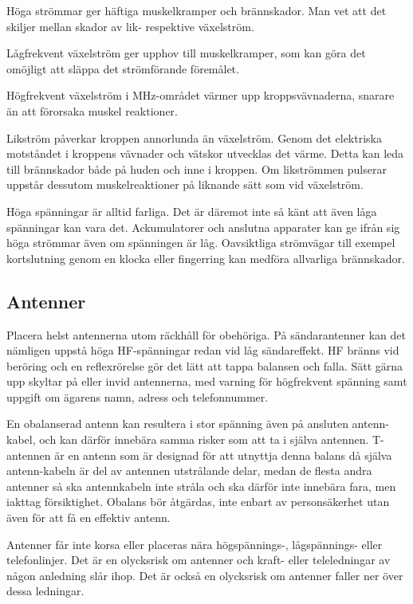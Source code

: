 Höga strömmar ger häftiga muskelkramper och brännskador.
Man vet att det skiljer mellan skador av lik- respektive växelström.

Lågfrekvent växelström ger upphov till muskelkramper, som kan göra det
omöjligt att släppa det strömförande föremålet.

Högfrekvent växelström i MHz-området värmer upp kroppsvävnaderna,
snarare än att förorsaka muskel reaktioner.

Likström påverkar kroppen annorlunda än växelström.
Genom det elektriska motståndet i kroppens vävnader och vätskor utvecklas det
värme.
Detta kan leda till brännskador både på huden och inne i kroppen.
Om likströmmen pulserar uppstår dessutom muskelreaktioner på liknande sätt som
vid växelström.

Höga spänningar är alltid farliga.
Det är däremot inte så känt att även låga spänningar kan vara det.
Ackumulatorer och anslutna apparater kan ge ifrån sig höga strömmar även om
spänningen är låg.
Oavsiktliga strömvägar till exempel kortslutning genom en klocka eller fingerring kan
medföra allvarliga brännskador.

\subsection{Antenner}

Placera helst antennerna utom räckhåll för obehöriga.
På sändarantenner kan det nämligen uppstå höga HF-spänningar redan vid
låg sändareffekt.
HF bränns vid beröring och en reflexrörelse gör det lätt att tappa balansen och
falla.
Sätt gärna upp skyltar på eller invid antennerna, med varning för högfrekvent
spänning samt uppgift om ägarens namn, adress och telefonnummer.

En obalanserad antenn kan resultera i stor spänning även på ansluten
antenn-kabel, och kan därför innebära samma risker som att ta i själva antennen.
T-antennen är en antenn som är designad för att utnyttja denna balans då själva
antenn-kabeln är del av antennen utstrålande delar, medan de flesta andra
antenner så ska antennkabeln inte stråla och ska därför inte innebära fara,
men iakttag försiktighet.
Obalans bör åtgärdas, inte enbart av personsäkerhet utan även för att få en
effektiv antenn.

Antenner får inte korsa eller placeras nära högspännings-, lågspännings- eller
telefonlinjer.
Det är en olycksrisk om antenner och kraft- eller teleledningar av någon
anledning slår ihop.
Det är också en olycksrisk om antenner faller ner över dessa ledningar.

